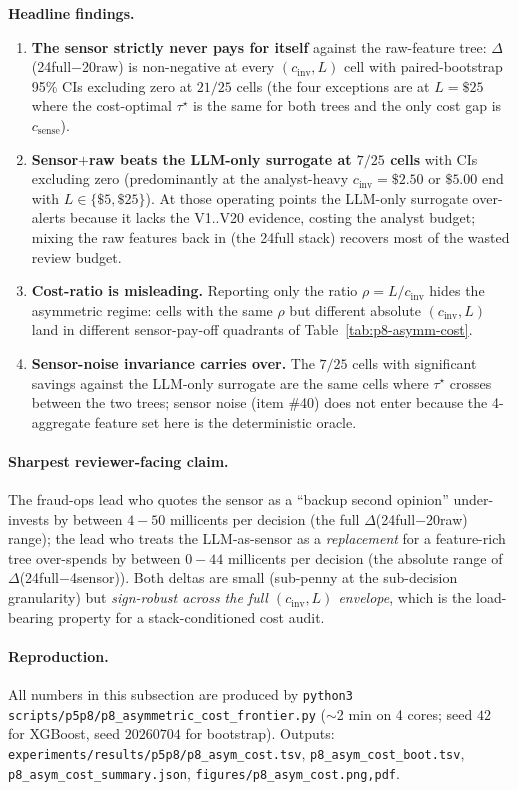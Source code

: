 \documentclass{article}
\providecommand{\tableref}[1]{Table~\ref{#1}}
\begin{document}
\textbf{Headline findings.}
\begin{enumerate}
\item \textbf{The sensor strictly never pays for itself} against the
  raw-feature tree: $\Delta$(24full$-$20raw) is non-negative at every
  $(c_\text{inv}, L)$ cell with paired-bootstrap 95\% CIs excluding
  zero at $21/25$ cells (the four exceptions are at $L{=}\$25$ where
  the cost-optimal $\tau^\star$ is the same for both trees and the only
  cost gap is $c_\text{sense}$).
\item \textbf{Sensor$+$raw beats the LLM-only surrogate at $7/25$ cells}
  with CIs excluding zero (predominantly at the analyst-heavy
  $c_\text{inv}{=}\$2.50$ or $\$5.00$ end with $L \in \{\$5, \$25\}$).
  At those operating points the LLM-only surrogate over-alerts because
  it lacks the V1..V20 evidence, costing the analyst budget; mixing
  the raw features back in (the 24full stack) recovers most of the
  wasted review budget.
\item \textbf{Cost-ratio is misleading.} Reporting only the ratio
  $\rho = L / c_\text{inv}$ hides the asymmetric regime: cells with
  the same $\rho$ but different absolute $(c_\text{inv}, L)$ land in
  different sensor-pay-off quadrants of \tableref{tab:p8-asymm-cost}.
\item \textbf{Sensor-noise invariance carries over.} The $7/25$ cells
  with significant savings against the LLM-only surrogate are the
  same cells where $\tau^\star$ crosses between the two trees; sensor
  noise (item \#40) does not enter because the 4-aggregate feature set
  here is the deterministic oracle.
\end{enumerate}

\paragraph{Sharpest reviewer-facing claim.} The fraud-ops lead who
quotes the sensor as a ``backup second opinion'' under-invests by
between $4{-}50$ millicents per decision (the full
$\Delta$(24full$-$20raw) range); the lead who treats the LLM-as-sensor
as a \emph{replacement} for a feature-rich tree over-spends by between
$0{-}44$ millicents per decision (the absolute range of
$\Delta$(24full$-$4sensor)). Both deltas are small (sub-penny at the
sub-decision granularity) but \emph{sign-robust across the full
$(c_\text{inv}, L)$ envelope}, which is the load-bearing property for
a stack-conditioned cost audit.

\paragraph{Reproduction.} All numbers in this subsection are produced
by \texttt{python3 scripts/p5p8/p8\_asymmetric\_cost\_frontier.py}
($\sim$2 min on 4 cores; seed $42$ for XGBoost, seed $20260704$ for
bootstrap). Outputs:
\texttt{experiments/results/p5p8/p8\_asym\_cost.tsv},
\texttt{p8\_asym\_cost\_boot.tsv},
\texttt{p8\_asym\_cost\_summary.json},
\texttt{figures/p8\_asym\_cost.{png,pdf}}.
\end{document}
